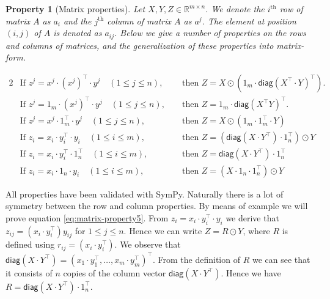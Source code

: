 \documentclass{article}
\newtheorem{property}[theorem]{Property}
\newcommand{\func}[1]{\ensuremath{\textsf{#1}}} %
\newcommand{\Reals}{\mathbb{R}}
\begin{document}
\begin{property}[Matrix properties]
Let $X, Y, Z \in \Reals^{m \times n}$. We denote the $i^\text{th}$ row of matrix $A$ as $a_i$ and the $j^\text{th}$ column of matrix $A$ as $a^j$. The element at position $(i,j)$ of $A$ is denoted as $a_{ij}$. Below we give a number of properties on the rows and columns of matrices, and the generalization of these properties into matrix-form.

\begin{alignat}{2}
&\text{If }
  z^j = x^j \cdot (x^j)^\top \cdot y^j \quad (1 \leq j \leq n),
&&\text{ then }
  Z = X \odot (1_m \cdot \func{diag}(X^\top \cdot Y)^\top).
\label{eq:matrix-property1}
\\  
&\text{If }
  z^j = 1_m \cdot (x^j)^\top \cdot y^j \quad (1 \leq j \leq n),
&&\text{ then }
  Z = 1_m \cdot \func{diag}(X^\top Y)^\top.
\label{eq:matrix-property2}
\\  
&\text{If }
  z^j = x^j \cdot 1_m^\top \cdot y^j \quad (1 \leq j \leq n),
&&\text{ then }
  Z = X \odot (1_m \cdot 1_m^\top \cdot Y)
\label{eq:matrix-property3}
\\  
&\text{If }
  z_i = x_i \cdot y_i^\top \cdot y_i \quad (1 \leq i \leq m),
&&\text{ then }
  Z = (\func{diag}(X \cdot Y^\top) \cdot 1_n^\top) \odot Y
\label{eq:matrix-property5}
\\  
&\text{If }
  z_i = x_i \cdot y_i^\top \cdot 1_n^\top \quad (1 \leq i \leq m),
&&\text{ then }
  Z = \func{diag}(X \cdot Y^\top) \cdot 1_n^\top
\label{eq:matrix-property6}
\\  
&\text{If }
  z_i = x_i \cdot 1_n \cdot y_i \quad (1 \leq i \leq m),
&&\text{ then }
  Z = (X \cdot 1_n \cdot 1_n^\top) \odot Y
\label{eq:matrix-property7}
\end{alignat}
\end{property}

\noindent
All properties have been validated with SymPy. Naturally there is a lot of symmetry between the row and column properties. By means of example we will prove equation \eqref{eq:matrix-property5}. From $z_i = x_i \cdot y_i^\top \cdot y_i$ we derive that $z_{ij} = (x_i \cdot y_i^\top) y_{ij}$ for $1 \leq j \leq n$. Hence we can write $Z = R \odot Y$, where $R$ is defined using $r_{ij} = (x_i \cdot y_i^\top)$. We observe that $\func{diag}(X \cdot Y^\top) = (x_1 \cdot y_1^\top, \ldots, x_m \cdot y_m^\top)^\top$. From the definition of $R$ we can see that it consists of $n$ copies of the column vector $\func{diag}(X \cdot Y^\top)$. Hence we have $R = \func{diag}(X \cdot Y^\top) \cdot 1_n^\top$.
\end{document}
